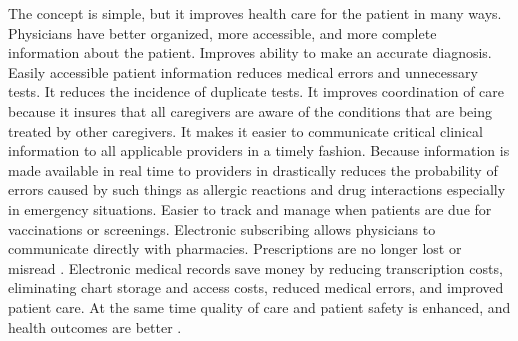 \documentclass[sigconf]{acmart}
\begin{document}
The concept is simple, but it improves health care for the patient in many ways. Physicians have better organized, more accessible, and more complete information about the patient.  Improves ability to make an accurate diagnosis.  Easily accessible patient information reduces medical errors and unnecessary tests. It reduces the incidence of duplicate tests. It improves coordination of care because it insures that all caregivers are aware of the conditions that are being treated by other caregivers. It makes it easier to communicate critical clinical information to all applicable providers in a timely fashion. Because information is made available in real time to providers in drastically reduces the probability of errors caused by such things as allergic reactions and drug interactions especially in emergency situations.  Easier to track and manage when patients are due for vaccinations or screenings. Electronic subscribing allows physicians to communicate directly with pharmacies. Prescriptions are no longer lost or misread \cite{www-google-elec}.
Electronic medical records save money by reducing transcription costs, eliminating chart storage and access costs, reduced medical errors, and improved patient care. At the same time quality of care and patient safety is enhanced, and health outcomes are better \cite{www-google-elec}. 
\end{document}
